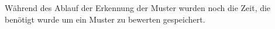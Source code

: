 W{\"a}hrend des Ablauf der Erkennung der Muster wurden noch die Zeit, die ben{\"o}tigt wurde um ein Muster zu bewerten gespeichert. 
















